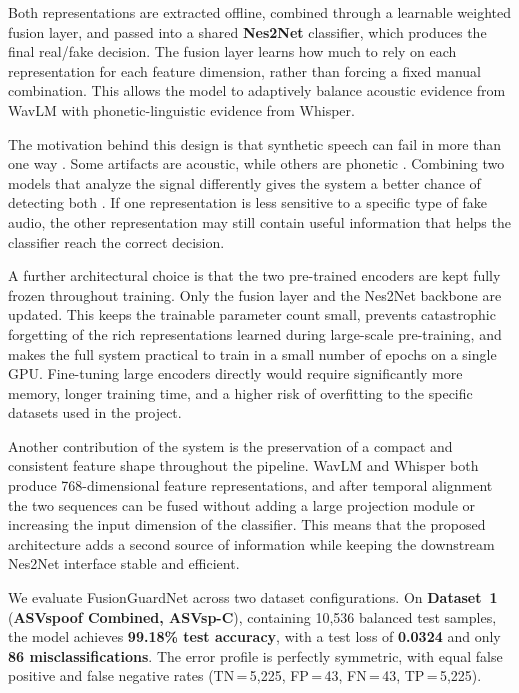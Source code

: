 \documentclass[11pt,a4paper]{article}
\begin{document}
Both representations are extracted offline, combined through a learnable weighted
fusion layer, and passed into a shared \textbf{Nes2Net} \cite{liu2025nes2net}
classifier, which produces the final real/fake decision. The fusion layer learns
how much to rely on each representation for each feature dimension, rather than
forcing a fixed manual combination. This allows the model to adaptively balance
acoustic evidence from WavLM with phonetic-linguistic evidence from Whisper.

The motivation behind this design is that synthetic speech can fail in more than
one way \cite{li2024survey,yi2023survey}. Some artifacts are acoustic, while
others are phonetic \cite{nguyen2025linguistic,zhu2024slim}. Combining two models
that analyze the signal differently gives the system a better chance of detecting
both \cite{pan2024attentive,elkheir2025two}. If one representation is less
sensitive to a specific type of fake audio, the other representation may still
contain useful information that helps the classifier reach the correct decision.

A further architectural choice is that the two pre-trained encoders are kept fully
frozen throughout training. Only the fusion layer and the Nes2Net backbone are
updated. This keeps the trainable parameter count small, prevents catastrophic
forgetting of the rich representations learned during large-scale pre-training,
and makes the full system practical to train in a small number of epochs on a
single GPU. Fine-tuning large encoders directly would require significantly more
memory, longer training time, and a higher risk of overfitting to the specific
datasets used in the project.

Another contribution of the system is the preservation of a compact and consistent
feature shape throughout the pipeline. WavLM \cite{chen2022wavlm} and Whisper
\cite{radford2023whisper} both produce 768-dimensional feature representations,
and after temporal alignment the two sequences can be fused without adding a large
projection module or increasing the input dimension of the classifier. This means
that the proposed architecture adds a second source of information while keeping
the downstream Nes2Net interface stable and efficient.

We evaluate FusionGuardNet across two dataset configurations. On \textbf{Dataset~1}
(\textbf{ASVspoof Combined, ASVsp-C}), containing 10,536 balanced test samples,
the model achieves \textbf{99.18\% test accuracy}, with a test loss of
\textbf{0.0324} and only \textbf{86 misclassifications}. The error profile is
perfectly symmetric, with equal false positive and false negative rates
(TN\,=\,5,225, FP\,=\,43, FN\,=\,43, TP\,=\,5,225).
\end{document}
